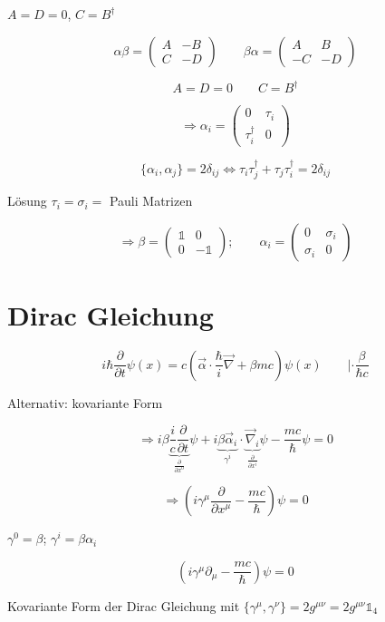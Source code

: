\(A=D=0\), \(C=B^\dagger\)

\[\alpha\beta = \begin{pmatrix}A&-B\\ C&-D\end{pmatrix}\qquad \beta\alpha = \begin{pmatrix}A&B\\ -C&-D\end{pmatrix}\]

\[A=D=0\qquad C=B^\dagger\]

\[\Rightarrow \alpha_i =\begin{pmatrix}0&\tau_i\\ \tau_i^\dagger&0\end{pmatrix} \]

\[\{\alpha_i,\alpha_j\}=2\delta_{ij} \Leftrightarrow \tau_i\tau_j^\dagger+\tau_j\tau_i^\dagger = 2\delta_{ij}\]

Lösung \(\tau_i=\sigma_i=\) Pauli Matrizen

\[\Rightarrow \boxed{ \beta= \begin{pmatrix}\mathbb 1&0\\ 0&-\mathbb 1\end{pmatrix};\qquad \alpha_i=\begin{pmatrix} 0&\sigma_i\\ \sigma_i&0\end{pmatrix} }\]

\section{Dirac Gleichung}

\[i\hbar \frac{\partial}{\partial t}\psi(x) = c(\vec \alpha\cdot\frac{\hbar}{i}\vec \nabla + \beta mc)\psi(x) \qquad |\cdot \frac{\beta}{\hbar c}\]

Alternativ: kovariante Form

\[\Rightarrow i\beta \underbrace{\frac{i}{c}\frac{\partial}{\partial t}}_{\frac{\partial}{\partial x^0}}\psi+i\underbrace{\beta\vec \alpha_i}_{\gamma^i}\cdot\underbrace{\vec\nabla_i}_{\frac{\partial}{\partial x^i} }\psi-\frac{mc}{\hbar}\psi=0\]

\[\Rightarrow (i\gamma^\mu\frac{\partial}{\partial x^\mu} - \frac{mc}{\hbar})\psi = 0 \]

\(\gamma^0 = \beta\); \(\gamma^i = \beta\alpha_i\)

\[\boxed{\left(i\gamma^\mu\partial_\mu - \frac{mc}{\hbar}\right)\psi=0}\]

Kovariante Form der Dirac Gleichung mit \(\boxed{\{\gamma^\mu,\gamma^\nu\}=2g^{\mu\nu}}=2g^{\mu\nu}\mathbb 1_4\)

